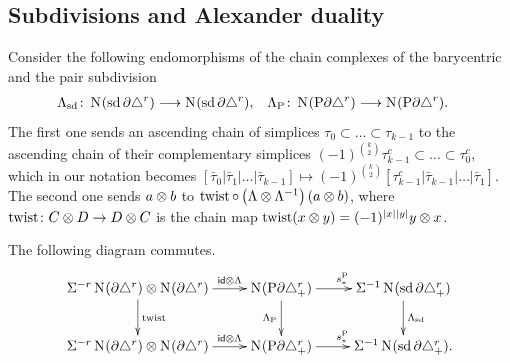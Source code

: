 \subsection{Subdivisions and Alexander duality}
Consider the following endomorphisms of the chain complexes of the barycentric and the pair subdivision
\begin{align*}
	\Lambda_{\operatorname{sd}} \colon \operatorname{N}_{}(\operatorname{sd} \partial\triangle^{r})& \longrightarrow \operatorname{N}_{}(\operatorname{sd} \partial\triangle^{r}),
	&
	\Lambda_{{\operatorname{P}}} \colon \operatorname{N}_{}({\operatorname{P}} \partial\triangle^{r})& \longrightarrow \operatorname{N}_{}({\operatorname{P}} \partial\triangle^{r}).
\end{align*}
The first one sends an ascending chain of simplices $\tau_0 \subset \dots \subset \tau_{k-1}$ to the ascending chain of their complementary simplices $(-1)^{\binom{k}{2}} \tau_{k-1}^c \subset \dots\subset\tau_0^c$, which in our notation becomes $[\bar{\tau}_0|\bar{\tau}_1|\dots|\bar{\tau}_{k-1}]\mapsto (-1)^{\binom{k}{2}}[\tau_{k-1}^c|\bar{\tau}_{k-1}|\dots|\bar{\tau}_1]$.
The second one sends $a \otimes b$ to $\operatorname{twist}\circ \left(\Lambda \otimes \Lambda^{-1}\right)(a \otimes b)$, where $\operatorname{twist}\colon C\otimes D\to D\otimes C$ is the chain map $\operatorname{twist}(x\otimes y) = (-1)^{|x||y|}y\otimes x$.
\begin{lemma}\label{lemma:diag_alex_twist} The following diagram commutes.
		\begin{equation*}
			\xymatrix{
		\susp{-r}\chains(\partial \simplex^{r})\ot \chains(\partial\simplex^{r})\ar[r]^-{\id\ot \alex}
		\ar[d]^{\twist} %
		&\chains(\Psd \partial \asimplex^{r}) \ar[r]^{s_*^{\Psd}}\ar[d]_{\alex_{\Psd}} %
		& \susp{-1}\chains(\sd \partial \asimplex^{r})
		\ar[d]^{\alex_{\sd}}
		\\
		\susp{-r}\chains(\partial \simplex^{r})\ot \chains(\partial\simplex^{r})
		\ar[r]^-{\id \ot \alex} 
		&\chains(\Psd \partial \asimplex^{r}) 
		\ar[r]^{s_*^{\Psd}}
		& \susp{-1}\chains(\sd \partial \asimplex^{r}).
	}
	\end{equation*}	
\end{lemma}

